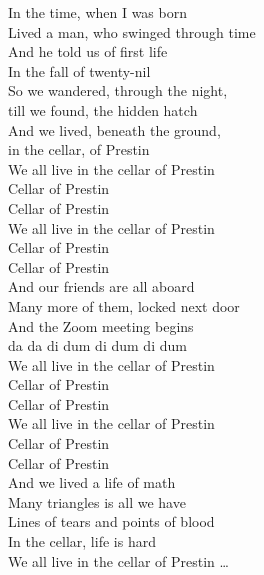 \documentclass[oneside]{memoir}
\begin{document}
\begin{singlespace}
\noindent 
\glqq In the time, when I was born \\
Lived a man, who swinged through time \\

\noindent 
And he told us of first life \\
In the fall of twenty-nil \\

\noindent
So we wandered, through the night, \\
till we found, the hidden hatch \\

\noindent
And we lived, beneath the ground, \\
in the cellar, of Prestin \\

\noindent 
We all live in the cellar of Prestin \\
Cellar of Prestin \\
Cellar of Prestin \\
We all live in the cellar of Prestin \\
Cellar of Prestin \\
Cellar of Prestin \\

\noindent 
And our friends are all aboard \\
Many more of them, locked next door \\

\noindent 
And the Zoom meeting begins \\
da da di dum di dum di dum \\

\noindent 
We all live in the cellar of Prestin \\
Cellar of Prestin \\
Cellar of Prestin \\
We all live in the cellar of Prestin \\
Cellar of Prestin \\
Cellar of Prestin \\

\noindent 
And we lived a life of math \\
Many triangles is all we have \\ 

\noindent 
Lines of tears and points of blood \\
In the cellar, life is hard \\ 

\noindent 
We all live in the cellar of Prestin \ldots\grqq
\end{singlespace}
\end{document}
